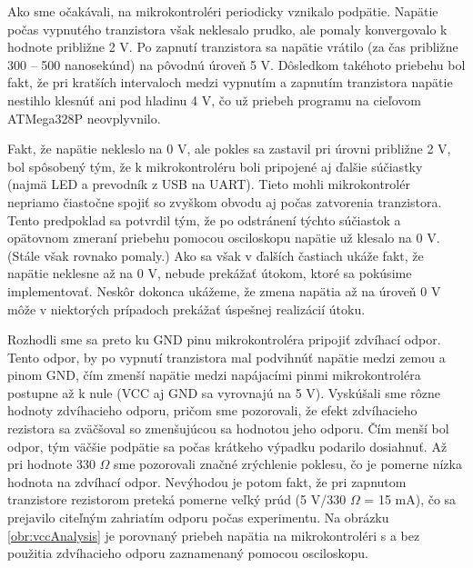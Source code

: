 Ako sme očakávali, na mikrokontroléri periodicky vznikalo podpätie. Napätie počas vypnutého tranzistora však neklesalo prudko, ale pomaly konvergovalo k hodnote približne 2 V. Po zapnutí tranzistora sa napätie vrátilo (za čas približne 300 -- 500 nanosekúnd) na pôvodnú úroveň 5 V. Dôsledkom takéhoto priebehu bol fakt, že pri kratších intervaloch medzi vypnutím a zapnutím tranzistora napätie nestihlo klesnúť ani pod hladinu 4 V, čo už priebeh programu na cieľovom ATMega328P neovplyvnilo.

Fakt, že napätie nekleslo na 0 V, ale pokles sa zastavil pri úrovni približne 2 V, bol spôsobený tým, že k mikrokontroléru boli pripojené aj ďalšie súčiastky (najmä LED a prevodník z USB na UART). Tieto mohli mikrokontrolér nepriamo čiastočne spojiť so zvyškom obvodu aj počas zatvorenia tranzistora. Tento predpoklad sa potvrdil tým, že po odstránení týchto súčiastok a opätovnom zmeraní priebehu pomocou osciloskopu napätie už klesalo na 0 V. (Stále však rovnako pomaly.) Ako sa však v ďalších častiach ukáže fakt, že napätie neklesne až na 0 V, nebude prekážať útokom, ktoré sa pokúsime implementovať. Neskôr dokonca ukážeme, že zmena napätia až na úroveň 0 V môže v niektorých prípadoch prekážať úspešnej realizácií útoku.

Rozhodli sme sa preto ku GND pinu mikrokontroléra pripojiť zdvíhací odpor. Tento odpor, by po vypnutí tranzistora mal podvihnúť napätie medzi zemou a pinom GND, čím zmenší napätie medzi napájacími pinmi mikrokontroléra postupne až k nule (VCC aj GND sa vyrovnajú na 5 V). Vyskúšali sme rôzne hodnoty zdvíhacieho odporu, pričom sme pozorovali, že efekt zdvíhacieho rezistora sa zväčšoval so zmenšujúcou sa hodnotou jeho odporu. Čím menší bol odpor, tým väčšie podpätie sa počas krátkeho výpadku podarilo dosiahnuť. Až pri hodnote 330 $\Omega$ sme pozorovali značné zrýchlenie poklesu, čo je pomerne nízka hodnota na zdvíhací odpor. Nevýhodou je potom fakt, že pri zapnutom tranzistore rezistorom preteká pomerne veľký prúd (5 V/330 $\Omega$ = 15 mA), čo sa prejavilo citeľným zahriatím odporu počas experimentu. Na obrázku \ref{obr:vccAnalysis} je porovnaný priebeh napätia na mikrokontroléri s a bez použitia zdvíhacieho odporu zaznamenaný pomocou osciloskopu.

